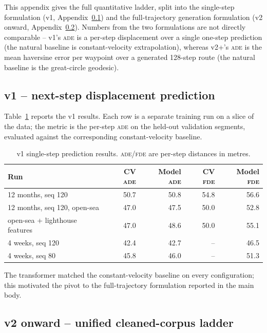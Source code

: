 \documentclass[oneside, a4paper, onecolumn, 11pt]{article}
\newcommand{\ade}{\textsc{ade}}
\newcommand{\fde}{\textsc{fde}}
\begin{document}
This appendix gives the full quantitative ladder, split into the
single-step formulation (v1, Appendix~\ref{app:v1}) and the
full-trajectory generation formulation (v2 onward,
Appendix~\ref{app:vN}).  Numbers from the two formulations are not
directly comparable -- v1's \ade{} is a per-step displacement over a
single one-step prediction (the natural baseline is constant-velocity
extrapolation), whereas v2+'s \ade{} is the mean haversine error per
waypoint over a generated 128-step route (the natural baseline is the
great-circle geodesic).

\subsection{v1 -- next-step displacement prediction}\label{app:v1}

Table~\ref{tab:v1_results} reports the v1 results.  Each row is a
separate training run on a slice of the data; the metric is the
per-step \ade{} on the held-out validation segments, evaluated against
the corresponding constant-velocity baseline.

\begin{table}[h]
\centering
\caption{v1 single-step prediction results.  \ade/\fde{} are per-step
distances in metres.}
\label{tab:v1_results}
\begin{tabular}{lrrrr}
\toprule
\textbf{Run} & \textbf{CV \ade} & \textbf{Model \ade} &
              \textbf{CV \fde} & \textbf{Model \fde} \\
\midrule
12 months, seq 120                 & 50.7 & 50.8 & 54.8 & 56.6 \\
12 months, seq 120, open-sea       & 47.0 & 47.5 & 50.0 & 52.8 \\
open-sea + lighthouse features     & 47.0 & 48.6 & 50.0 & 55.1 \\
4 weeks, seq 120                   & 42.4 & 42.7 & --   & 46.5 \\
4 weeks, seq 80                    & 45.8 & 46.0 & --   & 51.3 \\
\bottomrule
\end{tabular}
\end{table}

The transformer matched the constant-velocity baseline on every
configuration; this motivated the pivot to the full-trajectory
formulation reported in the main body.

\subsection{v2 onward -- unified cleaned-corpus ladder}\label{app:vN}
\end{document}
